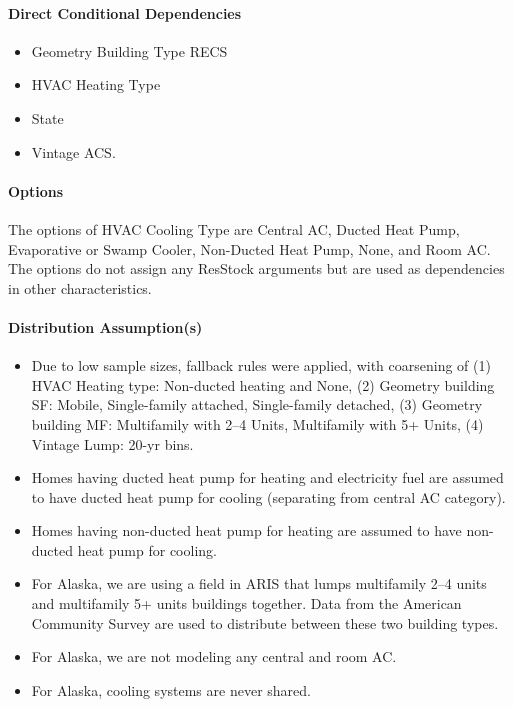 \paragraph{Direct Conditional Dependencies}
\begin{itemize}
    \item Geometry Building Type RECS
    \item HVAC Heating Type
    \item State
    \item Vintage ACS.
\end{itemize}

\paragraph{Options}
The options of HVAC Cooling Type are Central AC, Ducted Heat Pump, Evaporative or Swamp Cooler, Non-Ducted Heat Pump, None, and Room AC. The options do not assign any ResStock arguments but are used as dependencies in other characteristics.

\paragraph{Distribution Assumption(s)}
\begin{itemize}
    \item Due to low sample sizes, fallback rules were applied, with coarsening of  (1) HVAC Heating type: Non-ducted heating and None, (2) Geometry building SF: Mobile, Single-family attached, Single-family detached, (3) Geometry building MF: Multifamily with 2--4 Units, Multifamily with 5+ Units, (4) Vintage Lump: 20-yr bins. 
    \item Homes having ducted heat pump for heating and electricity fuel are assumed to have ducted heat pump for cooling (separating from central AC category).
    \item Homes having non-ducted heat pump for heating are assumed to have non-ducted heat pump for cooling.
    \item For Alaska, we are using a field in ARIS that lumps multifamily 2--4 units and multifamily 5+ units buildings together. Data from the American Community Survey are used to distribute between these two building types.
    \item For Alaska, we are not modeling any central and room AC.
    \item For Alaska, cooling systems are never shared.
\end{itemize}
 
